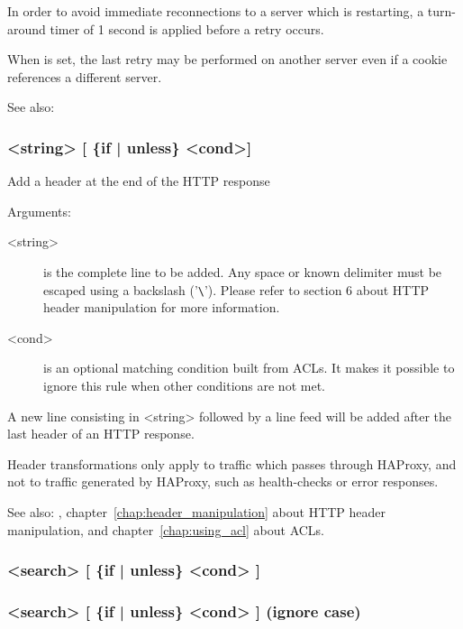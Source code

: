   In order to avoid immediate reconnections to a server which is restarting,
  a turn-around timer of 1 second is applied before a retry occurs.

  When  is set, the last retry may be performed on another
  server even if a cookie references a different server.


See also: 

\subsubsection[rspadd]{ <string> [ \{if | unless\} <cond>] }

  Add a header at the end of the HTTP response


  Arguments:
  \begin{description}
  \item[<string>] is the complete line to be added. Any space or known delimiter
              must be escaped using a backslash ('\verb|\|'). Please refer to section
              6 about HTTP header manipulation for more information.

  \item[<cond>] is an optional matching condition built from ACLs. It makes it
              possible to ignore this rule when other conditions are not met.
  \end{description}

  A new line consisting in <string> followed by a line feed will be added after
  the last header of an HTTP response.

  Header transformations only apply to traffic which passes through HAProxy,
  and not to traffic generated by HAProxy, such as health-checks or error
  responses.


See also: , chapter~\ref{chap:header_manipulation} about HTTP header manipulation,
  and chapter~\ref{chap:using_acl} about ACLs.

\subsubsection[rspdel]{ <search> [ \{if | unless\} <cond> ]}
\subsubsection[rspidel]{ <search> [ \{if | unless\} <cond> ]  (ignore case)}

